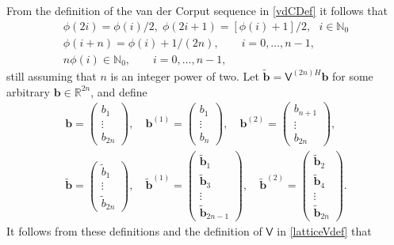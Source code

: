 \documentclass{iitthesis}          %
\newcommand{\bm}[1]{\boldsymbol{#1}}
\newcommand{\natzero}{\mathbb{N}_0}
\newcommand{\reals}{\mathbb{R}}
\newcommand{\vb}{\bm{b}}
\newcommand{\mV}{\mathsf{V}}
\begin{document}
From the definition of the van der Corput sequence in \eqref{vdCDef} it follows that
\begin{gather} 
\label{vdCProp}
\phi(2i) = \phi(i)/2, \;  \phi(2i+1) = [\phi(i)+1]/2, \ \ \ i \in \natzero\\
\label{vdCPropB}
\phi(i+n) = \phi(i) + 1/(2n), \qquad i = 0, \ldots, n-1,
\\
\label{vdCPropC}
n \phi(i) \in \natzero, \qquad i = 0, \ldots, n-1,
\end{gather}
still assuming that $n$ is an integer power of two.
Let $\widetilde{\vb} = \mV^{(2n)H}\vb$ for some arbitrary $\vb \in \reals^{2n}$, and define
\begin{gather*}
\vb = \begin{pmatrix} b_1 \\ \vdots \\ b_{2n} \end{pmatrix}, \quad 
\vb^{(1)} = \begin{pmatrix} b_1 \\ \vdots \\ b_{n} \end{pmatrix}, \quad 
\vb^{(2)}  = \begin{pmatrix} b_{n+1} \\ \vdots \\ b_{2n} \end{pmatrix}, \\ 
\widetilde{\vb} = \begin{pmatrix} \widetilde{b}_1 \\ \vdots \\ \widetilde{b}_{2n} \end{pmatrix}, \quad 
\widetilde{\vb}^{(1)} = \begin{pmatrix} \widetilde{\vb}_1 \\ \widetilde{\vb}_3 \\ \vdots \\ \widetilde{\vb}_{2n-1} \end{pmatrix}, \quad 
\widetilde{\vb}^{(2)}  = \begin{pmatrix} \widetilde{\vb}_{2} \\  \widetilde{\vb}_{4} \\ \vdots \\ \widetilde{\vb}_{2n} \end{pmatrix}. 
\end{gather*}
It follows from these definitions and the definition of $\mV$ in  \eqref{latticeVdef} that
\end{document}
